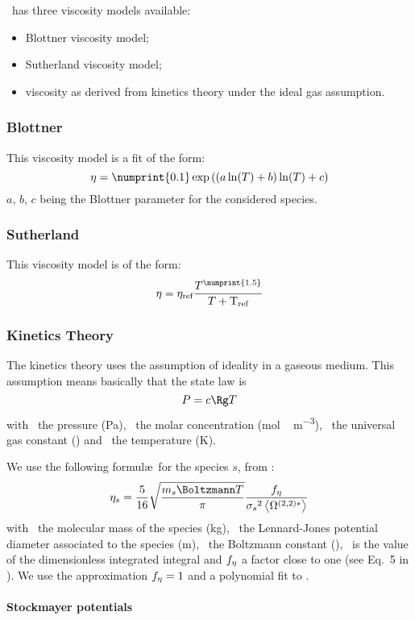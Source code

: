 \Antioch\ has three viscosity models available:
\begin{itemize}
\item Blottner viscosity model;
\item Sutherland viscosity model;
\item viscosity as derived from kinetics theory under the ideal gas assumption.
\end{itemize}

\subsubsection{Blottner}
\label{transport:viscosity:blottner}

This viscosity model is a fit of the form:
\begin{equation}
\vis = \numprint{0.1} \exp\left((a \ln(\Temp) + b) \ln(\Temp) + c\right)
\label{blottner:eq}
\end{equation}
$a$, $b$, $c$ being the Blottner parameter for the considered
species.

\subsubsection{Sutherland}
\label{transport:viscosity:sutherland}

This viscosity model is of the form:
\begin{equation}
\vis = \vis_\text{ref} \frac{\Temp^{\numprint{1.5}}}{\Temp + \text{T}_\text{ref}}
\label{sutherland:eq}
\end{equation}

\subsubsection{Kinetics Theory}
\label{transport:viscosity:kin_theo}

The kinetics theory uses the assumption of ideality in a 
gaseous medium. This assumption means basically that the
state law is
\begin{equation}
\Press = \conc\Rg \Temp
\end{equation}
with \Press\ the pressure (\unit{Pa}), \conc\ the molar concentration
(\unit{mol\,m^{-3}}), \Rg\ the universal gas constant (\RgEquation)
and \Temp\ the temperature (\unit{K}).

We use the following formul\ae\ for the species $s$, from \citet{Monchick1961}:
\begin{equation}
\vis[s] = \frac{5}{16} \sqrt{\frac{\Mass[s]\Boltzmann\Temp}{\pi}}\frac{f_{\vis}}{\LJdia[s]^2\Stockmayer{2}}
\label{visc_kin_theory:eq}
\end{equation}
with \Mass\ the molecular mass of the species (\unit{kg}), \LJdia\ the Lennard-Jones
potential diameter associated to the species (\unit{m}), \Boltzmann\ the Boltzmann
constant (\BoltzmannEquation), \ is the
value of the dimensionless integrated integral and $f_{\vis}$ a factor close
to one (see Eq.~5 in \citet{Monchick1961}). We use the approximation
$f_{\vis} = 1$ and a polynomial fit to .

\paragraph{Stockmayer potentials}
